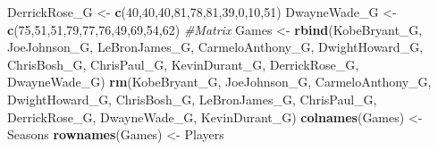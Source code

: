 \documentclass[
]{article}
\newenvironment{Shaded}{\begin{snugshade}}{\end{snugshade}}
\newcommand{\CommentTok}[1]{\textcolor[rgb]{0.56,0.35,0.01}{\textit{#1}}}
\newcommand{\DecValTok}[1]{\textcolor[rgb]{0.00,0.00,0.81}{#1}}
\newcommand{\KeywordTok}[1]{\textcolor[rgb]{0.13,0.29,0.53}{\textbf{#1}}}
\newcommand{\NormalTok}[1]{#1}
\newcommand{\StringTok}[1]{\textcolor[rgb]{0.31,0.60,0.02}{#1}}
\begin{document}
\begin{Shaded}
\begin{Highlighting}[]
\NormalTok{DerrickRose_G <-}\StringTok{ }\KeywordTok{c}\NormalTok{(}\DecValTok{40}\NormalTok{,}\DecValTok{40}\NormalTok{,}\DecValTok{40}\NormalTok{,}\DecValTok{81}\NormalTok{,}\DecValTok{78}\NormalTok{,}\DecValTok{81}\NormalTok{,}\DecValTok{39}\NormalTok{,}\DecValTok{0}\NormalTok{,}\DecValTok{10}\NormalTok{,}\DecValTok{51}\NormalTok{)}
\NormalTok{DwayneWade_G <-}\StringTok{ }\KeywordTok{c}\NormalTok{(}\DecValTok{75}\NormalTok{,}\DecValTok{51}\NormalTok{,}\DecValTok{51}\NormalTok{,}\DecValTok{79}\NormalTok{,}\DecValTok{77}\NormalTok{,}\DecValTok{76}\NormalTok{,}\DecValTok{49}\NormalTok{,}\DecValTok{69}\NormalTok{,}\DecValTok{54}\NormalTok{,}\DecValTok{62}\NormalTok{)}
\CommentTok{#Matrix}
\NormalTok{Games <-}\StringTok{ }\KeywordTok{rbind}\NormalTok{(KobeBryant_G, JoeJohnson_G, LeBronJames_G, CarmeloAnthony_G, DwightHoward_G, ChrisBosh_G, ChrisPaul_G, KevinDurant_G, DerrickRose_G, DwayneWade_G)}
\KeywordTok{rm}\NormalTok{(KobeBryant_G, JoeJohnson_G, CarmeloAnthony_G, DwightHoward_G, ChrisBosh_G, LeBronJames_G, ChrisPaul_G, DerrickRose_G, DwayneWade_G, KevinDurant_G)}
\KeywordTok{colnames}\NormalTok{(Games) <-}\StringTok{ }\NormalTok{Seasons}
\KeywordTok{rownames}\NormalTok{(Games) <-}\StringTok{ }\NormalTok{Players}


\end{Highlighting}
\end{Shaded}
\end{document}

